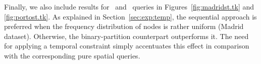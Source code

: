 	Finally, we also include results for \STtk\ and \STtks\ queries in Figures~\ref{fig:madridst.tk} and \ref{fig:portost.tk}. 
	As explained in Section~\ref{sec:exp:temp}, the sequential approach is preferred when the frequency distribution of nodes is
	rather uniform (Madrid dataset). Otherwise, the binary-partition counterpart outperforms it. The need for applying a temporal
	constraint simply accentuates this effect in comparison with the corresponding pure spatial queries.



